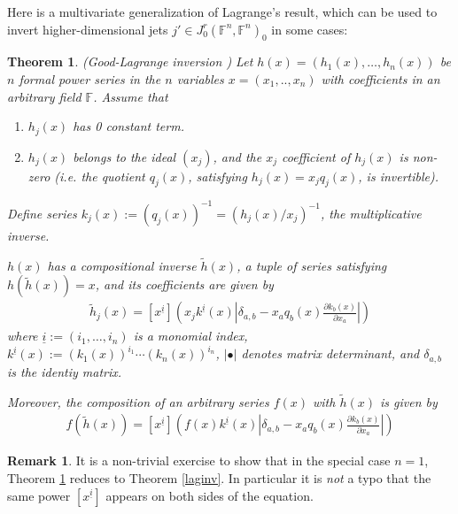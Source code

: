 \documentclass[12pt]{article}
\numberwithin{equation}{section}
\theoremstyle{plain}
\newtheorem{theorem}[definition]{Theorem}
\theoremstyle{definition}
\newtheorem{remark}[definition]{Remark}
\newcommand{\Fb}{\mathbb{F}}
\begin{document}
Here is a multivariate generalization of Lagrange's result, which can be used to invert higher-dimensional jets $j'\in J^{r}_0(\Fb^{n},\Fb^{n})_0$ in some cases:

\begin{theorem} \label{goodvers}\emph{(Good-Lagrange inversion \cite{goodlag})} Let $h(x)=(h_1(x),\dots,h_{n}(x))$ be $n$ formal power series in the $n$ variables $x=(x_1,..,x_n)$ with coefficients in an arbitrary field $\Fb$. Assume that
\begin{enumerate}
\itemsep0em
\item{$h_{j}(x)$ has 0 constant term.}
\item{$h_{j}(x)$ belongs to the ideal $(x_j)$, and the $x_j$ coefficient of $h_{j}(x)$ is non-zero (i.e. the quotient $q_{j}(x)$, satisfying $h_{j}(x)=x_jq_{j}(x)$, is invertible).}
\end{enumerate}
Define series $k_j(x):=(q_{j}(x))^{-1}=(h_j(x)/x_j)^{-1}$, the multiplicative inverse.

$h(x)$ has a compositional inverse $\widetilde{h}(x)$, a tuple of series satisfying $h(\widetilde{h}(x))=x$, and its coefficients are given by
\begin{align*}
[x^{\underline{i}}]\widetilde{h}_{j}(x)=[x^{\underline{i}}]\left(x_{j}k^{\underline{i}}(x)\left|\delta_{a,b}-x_{a}q_{b}(x)\frac{\partial k_{b}(x)}{\partial x_{a}}\right|\right)
\end{align*}
where $\underline{i}:=(i_1,\dots, i_n)$ is a monomial index, $k^{\underline{i}}(x):=(k_1(x))^{i_1}\cdots(k_n(x))^{i_n}$, $|\bullet|$ denotes matrix determinant, and $\delta_{a,b}$ is the identiy matrix. 

Moreover, the composition of an arbitrary series $f(x)$ with $\widetilde{h}(x)$ is given by
\begin{align*}
[x^{\underline{i}}]f(\widetilde{h}(x))=[x^{\underline{i}}]\left(f(x)k^{\underline{i}}(x)\left|\delta_{a,b}-x_{a}q_{b}(x)\frac{\partial k_{b}(x)}{\partial x_{a}}\right|\right)
\end{align*}
\end{theorem}

\begin{remark} It is a non-trivial exercise to show that in the special case $n=1$, Theorem \ref{goodvers} reduces to Theorem \ref{laginv}. In particular it is \emph{not} a typo that the same power $[x^{\underline{i}}]$ appears on both sides of the equation.
\end{remark}
\end{document}
